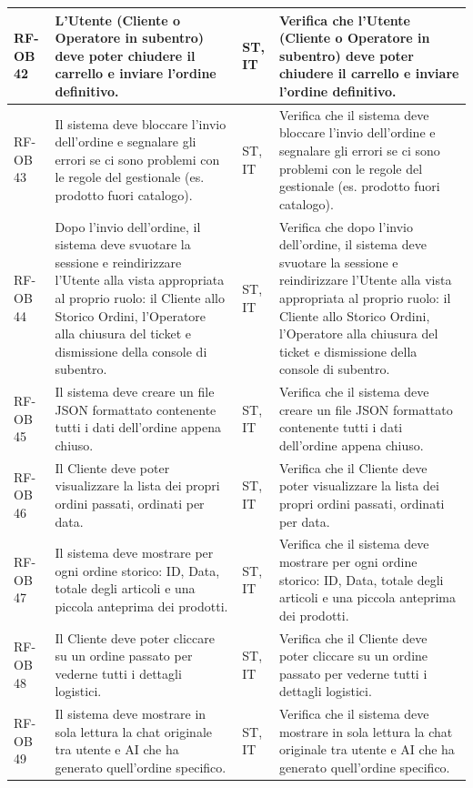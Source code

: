 \documentclass[a4paper,11pt,oneside]{scrartcl}
\begin{document}
\begin{longtable}{|p{1.5cm}|p{4.5cm}|p{1.8cm}|p{6cm}|}
RF-OB 42 & L'Utente (Cliente o Operatore in subentro) deve poter chiudere il carrello e inviare l'ordine definitivo. & ST, IT & Verifica che l'Utente (Cliente o Operatore in subentro) deve poter chiudere il carrello e inviare l'ordine definitivo. \\ \hline
RF-OB 43 & Il sistema deve bloccare l'invio dell'ordine e segnalare gli errori se ci sono problemi con le regole del gestionale (es. prodotto fuori catalogo). & ST, IT & Verifica che il sistema deve bloccare l'invio dell'ordine e segnalare gli errori se ci sono problemi con le regole del gestionale (es. prodotto fuori catalogo). \\ \hline
RF-OB 44 & Dopo l'invio dell'ordine, il sistema deve svuotare la sessione e reindirizzare l'Utente alla vista appropriata al proprio ruolo: il Cliente allo Storico Ordini, l'Operatore alla chiusura del ticket e dismissione della console di subentro. & ST, IT & Verifica che dopo l'invio dell'ordine, il sistema deve svuotare la sessione e reindirizzare l'Utente alla vista appropriata al proprio ruolo: il Cliente allo Storico Ordini, l'Operatore alla chiusura del ticket e dismissione della console di subentro. \\ \hline
RF-OB 45 & Il sistema deve creare un file JSON formattato contenente tutti i dati dell'ordine appena chiuso. & ST, IT & Verifica che il sistema deve creare un file JSON formattato contenente tutti i dati dell'ordine appena chiuso. \\ \hline
RF-OB 46 & Il Cliente deve poter visualizzare la lista dei propri ordini passati, ordinati per data. & ST, IT & Verifica che il Cliente deve poter visualizzare la lista dei propri ordini passati, ordinati per data. \\ \hline
RF-OB 47 & Il sistema deve mostrare per ogni ordine storico: ID, Data, totale degli articoli e una piccola anteprima dei prodotti. & ST, IT & Verifica che il sistema deve mostrare per ogni ordine storico: ID, Data, totale degli articoli e una piccola anteprima dei prodotti. \\ \hline
RF-OB 48 & Il Cliente deve poter cliccare su un ordine passato per vederne tutti i dettagli logistici. & ST, IT & Verifica che il Cliente deve poter cliccare su un ordine passato per vederne tutti i dettagli logistici. \\ \hline
RF-OB 49 & Il sistema deve mostrare in sola lettura la chat originale tra utente e AI che ha generato quell'ordine specifico. & ST, IT & Verifica che il sistema deve mostrare in sola lettura la chat originale tra utente e AI che ha generato quell'ordine specifico. \\ \hline

\end{longtable}
\end{document}
